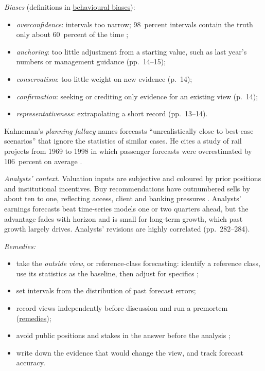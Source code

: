 \begin{qfmethod}\label{meth:forecast-biases-remedies}
 \emph{Biases} (definitions in \hyperref[def:behavioural-biases]{behavioural biases}):
\begin{itemize}
\item \emph{overconfidence}: intervals too narrow; 98~percent intervals contain the truth only about 60~percent of the time \citep[p.~12]{wide-barberis-thaler-survey};
\item \emph{anchoring}: too little adjustment from a starting value, such as last year's numbers or management guidance (pp.~14--15);
\item \emph{conservatism}: too little weight on new evidence (p.~14);
\item \emph{confirmation}: seeking or crediting only evidence for an existing view (p.~14);
\item \emph{representativeness}: extrapolating a short record (pp.~13--14).
\end{itemize}
Kahneman's \emph{planning fallacy} names forecasts ``unrealistically close to best-case scenarios'' that ignore the statistics of similar cases. He cites a study of rail projects from 1969 to 1998 in which passenger forecasts were overestimated by 106~percent on average \citep[chap.~23, ``The Planning Fallacy'']{thinking-fast-slow-2011}.

\emph{Analysts' context.} Valuation inputs are subjective and coloured by prior positions and institutional incentives. Buy recommendations have outnumbered sells by about ten to one, reflecting access, client and banking pressures \citep[pp.~2--3]{investment-valuation-2012}. Analysts' earnings forecasts beat time-series models one or two quarters ahead, but the advantage fades with horizon and is small for long-term growth, which past growth largely drives. Analysts' revisions are highly correlated (pp.~282--284).

\emph{Remedies:}
\begin{itemize}
\item take the \emph{outside view}, or reference-class forecasting: identify a reference class, use its statistics as the baseline, then adjust for specifics \citep[chap.~23, ``Mitigating the Planning Fallacy'']{thinking-fast-slow-2011};
\item set intervals from the distribution of past forecast errors;
\item record views independently before discussion and run a premortem (\hyperref[def:behavioural-biases]{remedies});
\item avoid public positions and stakes in the answer before the analysis \citep[p.~2]{investment-valuation-2012};
\item write down the evidence that would change the view, and track forecast accuracy.
\end{itemize}


\end{qfmethod}
